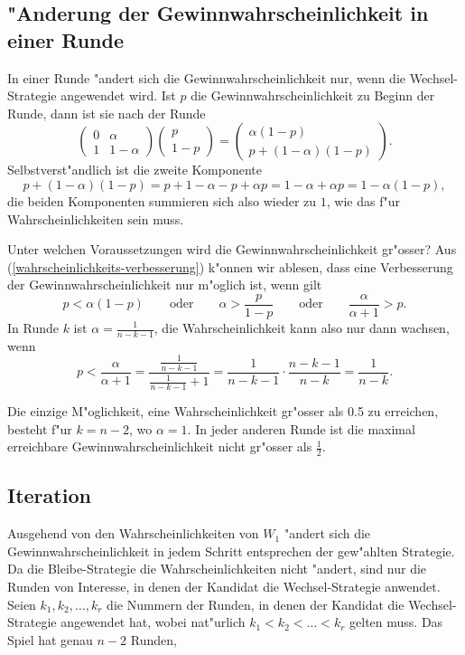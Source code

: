 \subsection{"Anderung der Gewinnwahrscheinlichkeit in einer Runde}
In einer Runde "andert sich die Gewinnwahrscheinlichkeit nur, wenn
die Wechsel-Strategie angewendet wird.
Ist $p$ die Gewinnwahrscheinlichkeit zu Beginn der Runde, dann ist sie
nach der Runde
\begin{equation}
\begin{pmatrix}
0&\alpha\\
1&1-\alpha
\end{pmatrix}
\begin{pmatrix}p\\1-p\end{pmatrix}
=
\begin{pmatrix}\alpha(1-p)\\p+(1-\alpha)(1-p)\end{pmatrix}.
\label{wahrscheinlichkeits-verbesserung}
\end{equation}
Selbstverst"andlich ist die zweite Komponente
\[
p+(1-\alpha)(1-p)=p+1-\alpha-p+\alpha p
=1-\alpha+\alpha p=1-\alpha(1-p),
\]
die beiden Komponenten summieren sich also wieder zu $1$, wie das f"ur
Wahrscheinlichkeiten sein muss.

Unter welchen Voraussetzungen wird die Gewinnwahrscheinlichkeit gr"osser?
Aus (\ref{wahrscheinlichkeits-verbesserung}) k"onnen wir ablesen, dass
eine Verbesserung der Gewinnwahrscheinlichkeit nur m"oglich ist, wenn
gilt
\[
p<\alpha(1-p)
\qquad\text{oder}\qquad
\alpha>\frac{p}{1-p}
\qquad\text{oder}\qquad
\frac{\alpha}{\alpha + 1}>p.
\]
In Runde $k$ ist $\alpha=\frac{1}{n-k-1}$, die Wahrscheinlichkeit kann
also nur dann wachsen, wenn
\[
p <\frac{\alpha}{\alpha + 1}
=
\frac{\displaystyle \frac1{n-k-1}}{\displaystyle\frac{1}{n-k-1}+1}
=
\frac1{n-k-1} \cdot \frac{n-k-1}{n-k}=\frac1{n-k}.
\]

Die einzige M"oglichkeit, eine Wahrscheinlichkeit gr"osser als 0.5 zu
erreichen, besteht f"ur $k=n-2$, wo $\alpha=1$. In jeder anderen Runde
ist die maximal erreichbare Gewinnwahrscheinlichkeit nicht gr"osser
als $\frac12$.

\subsection{Iteration}
Ausgehend von den Wahrscheinlichkeiten von $W_1$ "andert sich die
Gewinnwahrscheinlichkeit in jedem Schritt entsprechen der gew"ahlten
Strategie.
Da die Bleibe-Strategie die Wahrscheinlichkeiten nicht "andert, sind
nur die Runden von Interesse, in denen der Kandidat die Wechsel-Strategie
anwendet.
Seien $k_1, k_2,\dots,k_r$ die Nummern der Runden, in denen der
Kandidat die Wechsel-Strategie angewendet hat,
wobei nat"urlich $k_1 < k_2 < \dots < k_r$ gelten muss.
Das Spiel hat genau $n-2$ Runden, 

